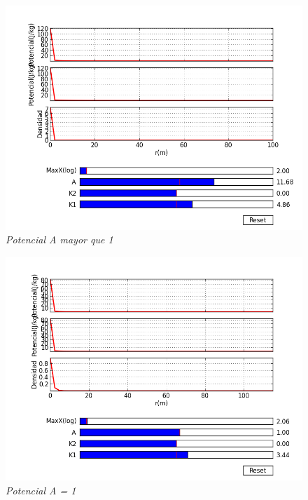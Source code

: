 \documentclass[12pt]{book}
\begin{document}
\begin{figure}[!h]
 \centering
 \includegraphics[scale=0.7]{potencial3.png}
 \caption{\emph{Potencial A mayor que 1}}
 \label{Fig: 3}
\end{figure}

\begin{figure}[!h]
 \centering
 \includegraphics[scale=0.7]{potencial2.png}
 \caption{\emph{Potencial A = 1}}
 \label{Fig: 2}
\end{figure}
\end{document}

